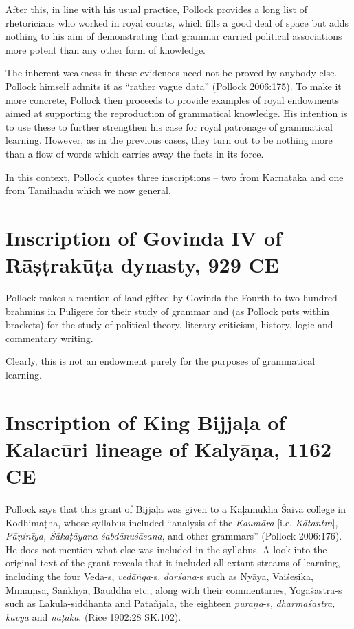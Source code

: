 After this, in line with his usual practice, Pollock provides a long list of rhetoricians who worked in royal courts, which fills a good deal of space but adds nothing to his aim of demonstrating that grammar carried political associations more potent than any other form of knowledge.

The inherent weakness in these evidences need not be proved by anybody else. Pollock himself admits it as ``rather vague data'' (Pollock 2006:175). To make it more concrete, Pollock then proceeds to provide examples of royal endowments aimed at supporting the reproduction of grammatical knowledge. His intention is to use these to further strengthen his case for royal patronage of grammatical learning. However, as in the previous cases, they turn out to be nothing more than a flow of words which carries away the facts in its force.

In this context, Pollock quotes three inscriptions -- two from Karnataka and one from Tamilnadu which we now general.

\section{Inscription of Govinda IV of Rāṣṭrakūṭa dynasty, 929 CE}\label{chap3-sec16}

Pollock makes a mention of land gifted by Govinda the Fourth to two hundred brahmins in Puligere for their study of grammar and (as Pollock puts within brackets) for the study of political theory, literary criticism, history, logic and commentary writing. 

Clearly, this is not an endowment purely for the purposes of grammatical learning.

\section{Inscription of King Bijjaḷa of Kalacūri lineage of Kalyāṇa, 1162 CE}\label{chap3-sec17}

Pollock says that this grant of Bijjaḷa was given to a Kāḷāmukha Śaiva college in Kodhimaṭha, whose syllabus included ``analysis of the {\sl Kaumāra} [i.e. {\sl Kātantra}], {\sl Pāṇinīya, Śākaṭāyana-śabdānuśāsana}, and other grammars'' (Pollock 2006:176). He does not mention what else was included in the syllabus. A look into the original text of the grant reveals that it included all extant streams of learning, including the four Veda-s, {\sl vedāṅga}-s, {\sl darśana}-s such as Nyāya, Vaiśeṣika, Mīmāṃsā, Sāṅkhya, Bauddha etc., along with their commentaries, Yogaśāstra-s such as Lākula-siddhānta and Pātañjala, the eighteen {\sl purāṇa}-s, {\sl dharmaśāstra, kāvya} and {\sl nāṭaka}. (Rice 1902:28 SK.102).

